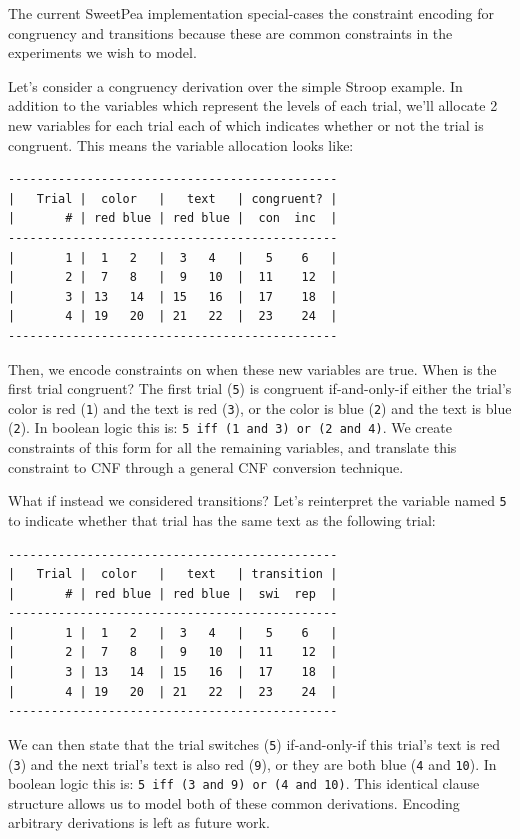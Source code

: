 The current SweetPea implementation special-cases the constraint encoding for congruency and transitions because these are common constraints in the experiments we wish to model.

Let's consider a congruency derivation over the simple Stroop example. In addition to the variables which represent the levels of each trial, we'll allocate 2 new variables for each trial each of which indicates whether or not the trial is congruent. This means the variable allocation looks like:

\begin{verbatim}
----------------------------------------------
|   Trial |  color   |   text   | congruent? |
|       # | red blue | red blue |  con  inc  |
----------------------------------------------
|       1 |  1   2   |  3   4   |   5    6   |
|       2 |  7   8   |  9   10  |  11    12  |
|       3 | 13   14  | 15   16  |  17    18  |
|       4 | 19   20  | 21   22  |  23    24  |
----------------------------------------------
\end{verbatim}

Then, we encode constraints on when these new variables are true. When is the first trial congruent? The first trial (\texttt{5}) is congruent if-and-only-if either the trial's color is red (\texttt{1}) and the text is red (\texttt{3}), or the color is blue (\texttt{2}) and the text is blue (\texttt{2}). In boolean logic this is: \texttt{5 iff (1 and 3) or (2 and 4)}. We create constraints of this form for all the remaining variables, and translate this constraint to CNF through a general CNF conversion technique.

What if instead we considered transitions? Let's reinterpret the variable named \texttt{5} to indicate whether that trial has the same text as the following trial:

\begin{verbatim}
----------------------------------------------
|   Trial |  color   |   text   | transition |
|       # | red blue | red blue |  swi  rep  |
----------------------------------------------
|       1 |  1   2   |  3   4   |   5    6   |
|       2 |  7   8   |  9   10  |  11    12  |
|       3 | 13   14  | 15   16  |  17    18  |
|       4 | 19   20  | 21   22  |  23    24  |
----------------------------------------------
\end{verbatim}

We can then state that the trial switches (\texttt{5}) if-and-only-if this trial's text is red (\texttt{3}) and the next trial's text is also red (\texttt{9}), or they are both blue (\texttt{4} and \texttt{10}). In boolean logic this is: \texttt{5 iff (3 and 9) or (4 and 10)}. This identical clause structure allows us to model both of these common derivations. Encoding arbitrary derivations is left as future work.

